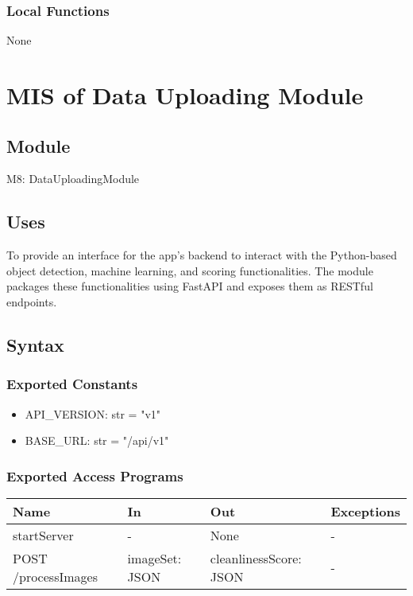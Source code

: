 \documentclass[12pt, titlepage]{article}
\begin{document}
\subsubsection{Local Functions}
None

\newpage

\section{MIS of Data Uploading Module} \label{Module} 

\subsection{Module}

M8: DataUploadingModule

\subsection{Uses}
To provide an interface for the app's backend to interact with the Python-based object detection, machine learning, and scoring functionalities. The module packages these functionalities using FastAPI and exposes them as RESTful endpoints.

\subsection{Syntax}

\subsubsection{Exported Constants}

\begin{itemize}
  \item API{\_}VERSION: str = "v1"
  \item BASE{\_}URL: str = "/api/v1"
\end{itemize}

\subsubsection{Exported Access Programs}

\begin{center}
\begin{tabular}{p{5cm} p{4cm} p{4cm} p{2cm}}
\hline
\textbf{Name} & \textbf{In} & \textbf{Out} & \textbf{Exceptions} \\
\hline
startServer & - & None & - \\
\hline
POST /processImages & imageSet: JSON & cleanlinessScore: JSON & - \\
\hline
\end{tabular}
\end{center}
\end{document}
